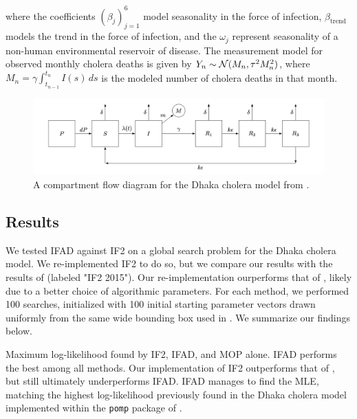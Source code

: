 \documentclass[9pt,twocolumn,pnasresearcharticle]{pnas-new}
\newcommand\arxiv[2]{#2} %
\begin{document}
where the coefficients $(\beta_j)_{j=1}^6$ model seasonality in the force of infection, $\beta_{\text{trend}}$ models the trend in the force of infection, and the $\omega_j$ represent seasonality of a non-human environmental reservoir of disease.
The measurement model for observed monthly cholera deaths is given by 
    $Y_n \sim {\mathcal{N}}(M_n, \tau^2M_n^2)$,
where $M_n=\gamma\int_{t_{n-1}}^{t_n}I(s)\, ds$ is the modeled number of cholera deaths in that month.


\begin{figure}
    \centering
    \includegraphics[width=\arxiv{14cm}{\textwidth/2}]{imgs/095/tikzcholera.png}
    \vspace*{-7mm}
    \caption{A compartment flow diagram for the Dhaka cholera model from \cite{king08}.}
    \label{fig:tikz-cholera}
\end{figure}

\subsection{Results}

We tested IFAD against IF2 on a global search problem for the Dhaka cholera model.
We re-implemented IF2 to do so, but we compare our results with the results of \cite{ionides15} (labeled "IF2 2015").
Our re-implementation ourperforms that of \cite{ionides15}, likely due to a better choice of algorithmic parameters.
For each method, we performed 100 searches, initialized with 100 initial starting parameter vectors drawn uniformly from the same wide bounding box used in \cite{ionides15}. We summarize our findings below. 

  
\begin{table}[h!]
\centering

\caption{Maximum log-likelihood found by IF2, IFAD, and MOP alone. IFAD performs the best among all methods. Our implementation of IF2 outperforms that of \cite{ionides15}, but still ultimately underperforms IFAD. IFAD manages to find the MLE, matching the highest log-likelihood previously found in the Dhaka cholera model implemented within the \texttt{pomp} package of \cite{king16}.}
\label{table:mle}
\end{table}
\end{document}
